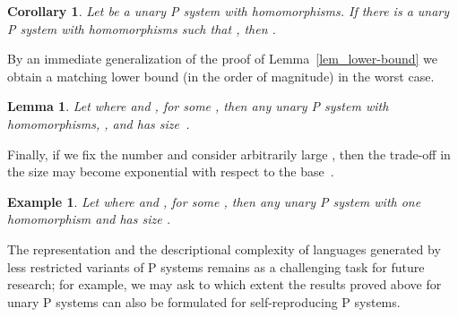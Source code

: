 \documentclass[copyright]{eptcs}
\makeatletter
\newtheorem{lemma}[theorem]{Lemma}
\newtheorem{corollary}[theorem]{Corollary}
\newtheorem{example}[theorem]{Example\dromanb}
\newcommand*{\dromanb}{\gdef\d@tstyle{\rmfamily\upshape\mdseries}}
\newcommand{\d@tstyle}{}
\makeatother
\begin{document}
\begin{corollary}
\label{cor:upper-bound} Let  be a unary P system with 
homomorphisms. If there is a unary P system  with 
homomorphisms such that ,
then .
\end{corollary}

By an immediate generalization of the proof of Lemma~\ref{lem_lower-bound}
we obtain a matching lower bound (in the order of magnitude) in the worst
case.

\begin{lemma}
Let  where  and , for some , then any
unary P system  with  homomorphisms, ,
and  has size~.
\end{lemma}

Finally, if we fix the number  and consider arbitrarily large , then
the trade-off in the size may become exponential with respect to the base~.

\begin{example}
Let  where  and , for some , then any
unary P system  with one homomorphism and  has size .\hfill
\end{example}

\bigskip

The representation and the descriptional complexity of languages generated
by less restricted variants of P systems remains as a challenging task for
future research; for example, we may ask to which extent the results proved
above for unary P systems can also be formulated for self-reproducing P
systems.



\end{document}
